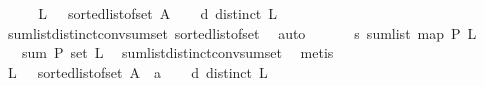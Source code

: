 \begin{isabellebody}
%
\isadelimproof
%
\endisadelimproof
%
\isatagproof
{}\isamarkupfalse%
\ {\isacharminus}{\kern0pt}\isanewline
\ \ \isamarkupfalse%
\ {\isacharquery}{\kern0pt}L{}\ {\isacharequal}{\kern0pt}\ \ {\isachardoublequoteopen}{\isacharparenleft}{\kern0pt}sorted{\isacharunderscore}{\kern0pt}list{\isacharunderscore}{\kern0pt}of{\isacharunderscore}{\kern0pt}set\ {\isacharparenleft}{\kern0pt}A{\isacharparenright}{\kern0pt}{\isacharparenright}{\kern0pt}{\isachardoublequoteclose}\isanewline
\ \ \isamarkupfalse%
\ d{\isacharunderscore}{\kern0pt}{}{\isacharcolon}{\kern0pt}\ {\isachardoublequoteopen}distinct\ {\isacharquery}{\kern0pt}L{}{\isachardoublequoteclose}\ \isamarkupfalse%
\ sum{\isacharunderscore}{\kern0pt}list{\isacharunderscore}{\kern0pt}distinct{\isacharunderscore}{\kern0pt}conv{\isacharunderscore}{\kern0pt}sum{\isacharunderscore}{\kern0pt}set\ sorted{\isacharunderscore}{\kern0pt}list{\isacharunderscore}{\kern0pt}of{\isacharunderscore}{\kern0pt}set{\isacharparenleft}{\kern0pt}{}{\isacharparenright}{\kern0pt}\ \isamarkupfalse%
\ auto\isanewline
\ \ \ \isamarkupfalse%
\ \isamarkupfalse%
\ s{\isacharunderscore}{\kern0pt}{}{\isacharcolon}{\kern0pt}\ {\isachardoublequoteopen}sum{\isacharunderscore}{\kern0pt}list\ {\isacharparenleft}{\kern0pt}{\isacharparenleft}{\kern0pt}map\ P{\isacharparenright}{\kern0pt}\ {\isacharquery}{\kern0pt}L{}{\isacharparenright}{\kern0pt}\ \isanewline
\ \ {\isacharequal}{\kern0pt}\ sum\ P\ {\isacharparenleft}{\kern0pt}set\ {\isacharquery}{\kern0pt}L{}{\isacharparenright}{\kern0pt}{\isachardoublequoteclose}\ \isamarkupfalse%
\ sum{\isacharunderscore}{\kern0pt}list{\isacharunderscore}{\kern0pt}distinct{\isacharunderscore}{\kern0pt}conv{\isacharunderscore}{\kern0pt}sum{\isacharunderscore}{\kern0pt}set\ \isamarkupfalse%
\ metis\isanewline
\ \ \isamarkupfalse%
\ {\isacharquery}{\kern0pt}L{}\ {\isacharequal}{\kern0pt}\ {\isachardoublequoteopen}\ {\isacharparenleft}{\kern0pt}sorted{\isacharunderscore}{\kern0pt}list{\isacharunderscore}{\kern0pt}of{\isacharunderscore}{\kern0pt}set\ {\isacharparenleft}{\kern0pt}A\ {\isacharminus}{\kern0pt}\ {\isacharbraceleft}{\kern0pt}a{\isacharbraceright}{\kern0pt}{\isacharparenright}{\kern0pt}{\isacharparenright}{\kern0pt}{\isachardoublequoteclose}\isanewline
\ \ \isamarkupfalse%
\ d{\isacharunderscore}{\kern0pt}{}{\isacharcolon}{\kern0pt}\ {\isachardoublequoteopen}distinct\ {\isacharquery}{\kern0pt}L{}{\isachardoublequoteclose}\ \isamarkupfalse%

\end{isabellebody}
